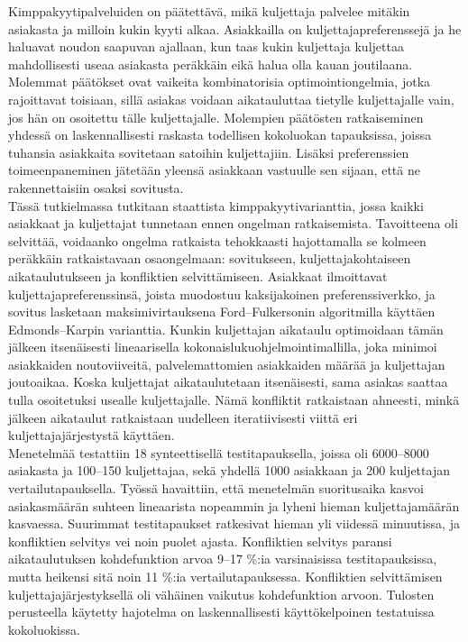 \documentclass[english, 12pt, a4paper, sci, utf8, a-2b, online]{aaltothesis}
\theoremstyle{definition}
\theoremstyle{plain}
\theoremstyle{remark}
\begin{document}
\begin{abstractpage}[finnish] %
Kimppakyytipalveluiden on päätettävä, mikä kuljettaja palvelee mitäkin asiakasta ja milloin kukin kyyti alkaa. Asiakkailla on kuljettajapreferenssejä ja he haluavat noudon saapuvan ajallaan, kun taas kukin kuljettaja kuljettaa mahdollisesti useaa asiakasta peräkkäin eikä halua olla kauan joutilaana. Molemmat päätökset ovat vaikeita kombinatorisia optimointiongelmia, jotka rajoittavat toisiaan, sillä asiakas voidaan aikatauluttaa tietylle kuljettajalle vain, jos hän on osoitettu tälle kuljettajalle. Molempien päätösten ratkaiseminen yhdessä on laskennallisesti raskasta todellisen kokoluokan tapauksissa, joissa tuhansia asiakkaita sovitetaan satoihin kuljettajiin. Lisäksi preferenssien toimeenpaneminen jätetään yleensä asiakkaan vastuulle sen sijaan, että ne rakennettaisiin osaksi sovitusta.\\
\indent Tässä tutkielmassa tutkitaan staattista kimppakyytivarianttia, jossa kaikki asiakkaat ja kuljettajat tunnetaan ennen ongelman ratkaisemista. Tavoitteena oli selvittää, voidaanko ongelma ratkaista tehokkaasti hajottamalla se kolmeen peräkkäin ratkaistavaan osaongelmaan: sovitukseen, kuljettajakohtaiseen aikataulutukseen ja konfliktien selvittämiseen. Asiakkaat ilmoittavat kuljettajapreferenssinsä, joista muodostuu kaksijakoinen preferenssiverkko, ja sovitus lasketaan maksimivirtauksena Ford–Fulkersonin algoritmilla käyttäen Edmonds–Karpin varianttia. Kunkin kuljettajan aikataulu optimoidaan tämän jälkeen itsenäisesti lineaarisella kokonaislukuohjelmointimallilla, joka minimoi asiakkaiden noutoviiveitä, palvelemattomien asiakkaiden määrää ja kuljettajan joutoaikaa. Koska kuljettajat aikataulutetaan itsenäisesti, sama asiakas saattaa tulla osoitetuksi usealle kuljettajalle. Nämä konfliktit ratkaistaan ahneesti, minkä jälkeen aikataulut ratkaistaan uudelleen iteratiivisesti viittä eri kuljettajajärjestystä käyttäen.\\
\indent Menetelmää testattiin 18 synteettisellä testitapauksella, joissa oli 6000–8000 asiakasta ja 100–150 kuljettajaa, sekä yhdellä 1000 asiakkaan ja 200 kuljettajan vertailutapauksella. Työssä havaittiin, että menetelmän suoritusaika kasvoi asiakasmäärän suhteen lineaarista nopeammin ja lyheni hieman kuljettajamäärän kasvaessa. Suurimmat testitapaukset ratkesivat hieman yli viidessä minuutissa, ja konfliktien selvitys vei noin puolet ajasta. Konfliktien selvitys paransi aikataulutuksen kohdefunktion arvoa 9–17 \%:ia varsinaisissa testitapauksissa, mutta heikensi sitä noin 11 \%:ia vertailutapauksessa. Konfliktien selvittämisen kuljettajajärjestyksellä oli vähäinen vaikutus kohdefunktion arvoon. Tulosten perusteella käytetty hajotelma on laskennallisesti käyttökelpoinen testatuissa kokoluokissa.
\end{abstractpage}
\end{document}
